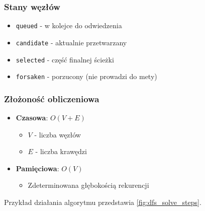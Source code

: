 \documentclass[../../../../doc.tex]{subfiles}
\begin{document}
\subsubsection{Stany węzłów}
\begin{itemize}
  \item \texttt{queued} - w kolejce do odwiedzenia
  \item \texttt{candidate} - aktualnie przetwarzany
  \item \texttt{selected} - część finalnej ścieżki
  \item \texttt{forsaken} - porzucony (nie prowadzi do mety)
\end{itemize}

\subsubsection{Złożoność obliczeniowa}
\begin{itemize}
  \item \textbf{Czasowa}: $O(V + E)$
        \begin{itemize}
          \item $V$ - liczba węzłów
          \item $E$ - liczba krawędzi
        \end{itemize}
  \item \textbf{Pamięciowa}: $O(V)$
        \begin{itemize}
          \item Zdeterminowana głębokością rekurencji
        \end{itemize}
\end{itemize}

Przykład działania algorytmu przedstawia \cref{fig:dfs_solve_steps}.


\end{document}

